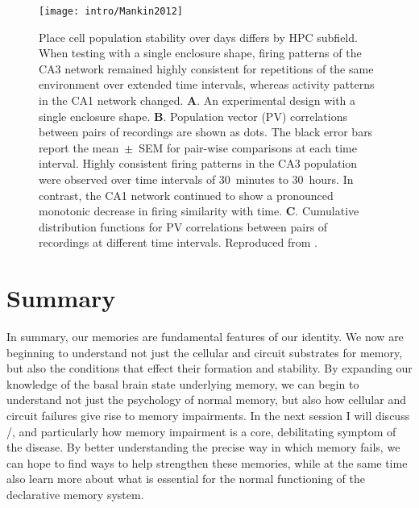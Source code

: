 \begin{figure}
	\centering
	\texttt{[image: intro/Mankin2012]}
	\caption[Place cell population stability over days]{
		Place cell population stability over days differs by \ac{HPC} subfield.
		When testing with a single enclosure shape, firing patterns of the CA3 network remained highly consistent for repetitions of the same environment over extended time intervals, whereas activity patterns in the CA1 network changed.
		\textbf{A}. An experimental design with a single enclosure shape.
		\textbf{B}. Population vector (PV) correlations between pairs of recordings are shown as dots. The black error bars report the mean~$\pm$~SEM for pair-wise comparisons at each time interval.
		Highly consistent firing patterns in the CA3 population were observed over time intervals of 30~minutes to 30~hours. In contrast, the CA1 network continued to show a pronounced monotonic decrease in firing similarity with time.
		\textbf{C}. Cumulative distribution functions for PV correlations between pairs of recordings at different time intervals.
		Reproduced from \citet{Mankin2012}.}
	\label{fig:intro:memory:time_stability}
\end{figure}

\section{Summary}
In summary, our memories are fundamental features of our identity.
We now are beginning to understand not just the cellular and circuit substrates for memory, but also the conditions that effect their formation and stability.
By expanding our knowledge of the basal brain state underlying memory, we can begin to understand not just the psychology of normal memory, but also how cellular and circuit failures give rise to memory impairments.
In the next session I will discuss \scz/, and particularly how memory impairment is a core, debilitating symptom of the disease.
By better understanding the precise way in which memory fails, we can hope to find ways to help strengthen these memories, while at the same time also learn more about what is essential for the normal functioning of the declarative memory system.

